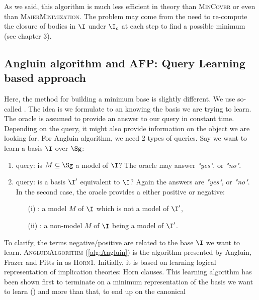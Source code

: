 \begin{figure}[ht]
	
\end{figure}

As we said, this algorithm is much less 
efficient in theory than \textsc{MinCover} or even than \textsc{MaierMinimization}. The problem may come from the need to re-compute the closure of bodies in $\I$ under $\I_c$ at each step to find a possible minimum (see chapter 3).

\subsection{Angluin algorithm and AFP: Query Learning based approach}

Here, the method for building a minimum base is slightly different. We use 
so-called . The idea is we formulate 
to an  knowing the basis we are trying to learn. The oracle 
is assumed to provide an answer to our query in constant time. Depending on 
the query, it might also provide information on the object we are looking for.
For Angluin algorithm, we need 2 types of queries. Say we want to learn
a basis $\I$ over $\Sg$:
\begin{enumerate}
	\item {} query: is $M \subseteq \Sg$ a model of $\I$? The
	oracle may answer \textit{"yes"}, or \textit{"no"}.
	\item {} query: is a basis $\I'$ equivalent to $\I$? Again
	the answers are \textit{"yes"}, or \textit{"no"}. In the second case, the oracle provides a	 either positive or negative:
	\begin{itemize}
		\item[(i)] : a model $M$ of $\I$ which is not a
		model of $\I'$,
		\item[(ii)] : a non-model $M$ of $\I$ being a model
		of $\I'$. 
	\end{itemize}
\end{enumerate}
\noindent To clarify, the terms negative/positive are related to the base $\I$
we want to learn. \textsc{AngluinAlgorithm} (\ref{alg:Angluin}) is the algorithm presented by Angluin, Frazer and Pitts in \cite{angluin_learning_1992} as \textsc{Horn1}. 
Initially, it is based on learning logical representation of implication theories: Horn clauses. This learning algorithm has been shown first to terminate on a minimum representation of the basis we want to learn (\cite{angluin_learning_1992}) and more than that, to end up on the canonical
